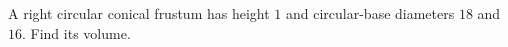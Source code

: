 A right circular conical frustum has height $1$ and circular-base diameters $18$ and $16$. Find its volume.
